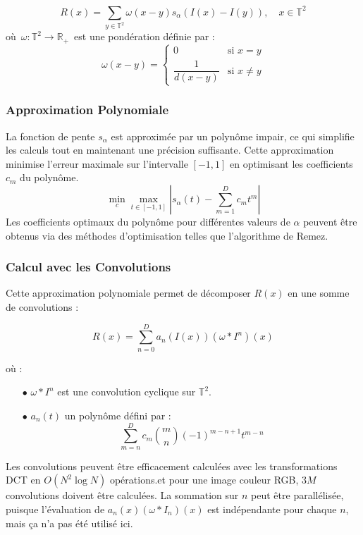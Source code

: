 \documentclass[10pt, a4paper]{extarticle}
\numberwithin{equation}{section}
\numberwithin{figure}{section}
\begin{document}
\begin{equation}
R(x) = \sum_{y \in  \mathbb{T}^2} \omega(x - y)s_\alpha(I(x) - I(y)), \quad x \in \mathbb{T}^2
\end{equation}
où $\,\omega : \mathbb{T}^2 \longrightarrow \mathbb{R}_{+}\,$ est une pondération définie par :
$$
\omega(x - y) =
\begin{cases}
0 & \text{si } x = y \\
\dfrac{1}{d(x - y)} & \text{si } x \neq y
\end{cases}
$$
\subsubsection{Approximation Polynomiale}

La fonction de pente $s_\alpha$ est approximée par un polynôme impair, ce qui simplifie les calculs tout en maintenant une précision suffisante. Cette approximation minimise l'erreur maximale sur l'intervalle \([-1, 1]\) en optimisant les coefficients \( c_m \) du polynôme.
$$
\min_{c} \max_{t \in [-1, 1]} \left| s_\alpha(t) - \sum_{m=1}^{D} c_m t^m \right|
$$
Les coefficients optimaux du polynôme pour différentes valeurs de \( \alpha \) peuvent être obtenus via des méthodes d'optimisation telles que l'algorithme de Remez.

\subsubsection{Calcul avec les Convolutions}
\par Cette approximation polynomiale permet de décomposer \( R(x) \) en une somme de convolutions :

\begin{equation}
R(x) = \sum_{n=0}^{D} a_n\left(I(x)\right) \left( \omega * I^n \right)(x)
\end{equation}

où :
\begin{itemize}
\item[$\bullet$] \( \omega * I^n \) est une convolution cyclique sur \( \mathbb{T}^2 \).
\item[$\bullet$]  \( a_n\left(t\right) \) un polynôme défini par :
$$
\sum_{m=n}^{D} c_m \binom{m}{n} (-1)^{m-n+1} t^{m-n}
$$
\end{itemize}

 Les convolutions peuvent être efficacement calculées avec les transformations DCT en \( O(N^2 \log N) \) opérations.et pour une image couleur RGB, \( 3M \) convolutions doivent être calculées. La sommation sur \( n \) peut être parallélisée, puisque l'évaluation de \( a_n(x) \left( \omega * I_n \right)(x) \) est indépendante pour chaque \( n \), mais ça n'a pas été utilisé ici.
\end{document}
